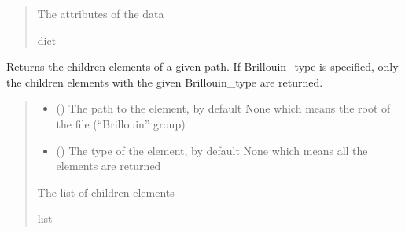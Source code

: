 \documentclass[letterpaper,10pt,english]{sphinxmanual}
\begin{document}
\begin{fulllineitems}
\begin{fulllineitems}
\begin{quote}
\begin{description}
\sphinxAtStartPar
{} \textendash{} The attributes of the data

\sphinxAtStartPar
dict

\end{description}\end{quote}

\end{fulllineitems}


\begin{fulllineitems}
\label{\detokenize{_autosummary/HDF5_BLS.wrapper:HDF5_BLS.wrapper.Wrapper.get_children_elements}}
\pysigstartsignatures
\pysiglinewithargsret
{}
{\sphinxparamcomma {}}
{}
\pysigstopsignatures
\sphinxAtStartPar
Returns the children elements of a given path. If Brillouin\_type is specified, only the children elements with the given Brillouin\_type are returned.
\begin{quote}\begin{description}
\begin{itemize}
\item {} 
\sphinxAtStartPar
{} (\sphinxstyleliteralemphasis{\sphinxupquote{, }}) \textendash{} The path to the element, by default None which means the root of the file (“Brillouin” group)

\item {} 
\sphinxAtStartPar
{} (\sphinxstyleliteralemphasis{\sphinxupquote{, }}) \textendash{} The type of the element, by default None which means all the elements are returned

\end{itemize}

\sphinxAtStartPar
The list of children elements

\sphinxAtStartPar
list


\end{description}
\end{quote}
\end{fulllineitems}
\end{fulllineitems}
\end{document}
